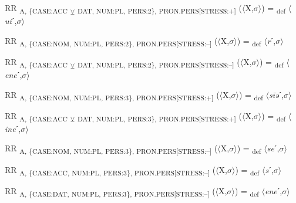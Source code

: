 {\begin{exe}
 RR \textsubscript{A, \{CASE:ACC} \textsubscript{${\veebar}$}\textsubscript{ DAT, NUM:PL, PERS:2\}, PRON.PERS[STRESS:+]} ($\langle$X,$\sigma $$\rangle$) = \textsubscript{def} $\langle$\textit{ui}ˊ,$\sigma $$\rangle$
\end{exe}

\begin{exe}
 RR \textsubscript{A, \{CASE:NOM, NUM:PL, PERS:2\}, PRON.PERS[STRESS:–]} ($\langle$X,$\sigma $$\rangle$) = \textsubscript{def} $\langle$\textit{r}ˊ,$\sigma $$\rangle$
\end{exe}

\begin{exe}
 RR \textsubscript{A, \{CASE:ACC} \textsubscript{${\veebar}$}\textsubscript{ DAT, NUM:PL, PERS:2\}, PRON.PERS[STRESS:–]} ($\langle$X,$\sigma $$\rangle$) = \textsubscript{def} $\langle$\textit{ene}ˊ,$\sigma $$\rangle$
\end{exe}

\begin{exe}
 RR \textsubscript{A, \{CASE:NOM, NUM:PL, PERS:3\}, PRON.PERS[STRESS:+]} ($\langle$X,$\sigma $$\rangle$) = \textsubscript{def} $\langle$\textit{s\=iə}ˊ,$\sigma $$\rangle$
\end{exe}

\begin{exe}
 RR \textsubscript{A, \{CASE:ACC} \textsubscript{${\veebar}$}\textsubscript{ DAT, NUM:PL, PERS:3\}, PRON.PERS[STRESS:+]} ($\langle$X,$\sigma $$\rangle$) = \textsubscript{def} $\langle$\textit{ine}ˊ,$\sigma $$\rangle$
\end{exe}

\begin{exe}
 RR \textsubscript{A, \{CASE:NOM, NUM:PL, PERS:3\}, PRON.PERS[STRESS:–]} ($\langle$X,$\sigma $$\rangle$) = \textsubscript{def} $\langle$\textit{se}ˊ,$\sigma $$\rangle$
\end{exe}

\begin{exe}
 RR \textsubscript{A, \{CASE:ACC, NUM:PL, PERS:3\}, PRON.PERS[STRESS:–]} ($\langle$X,$\sigma $$\rangle$) = \textsubscript{def} $\langle$\textit{s}ˊ,$\sigma $$\rangle$
\end{exe}

\begin{exe}
 RR \textsubscript{A, \{CASE:DAT, NUM:PL, PERS:3\}, PRON.PERS[STRESS:–]} ($\langle$X,$\sigma $$\rangle$) = \textsubscript{def} $\langle$\textit{ene}ˊ,$\sigma $$\rangle$
\end{exe}

}
